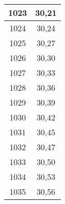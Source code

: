 \documentclass[10pt]{article}
\begin{document}
\begin{table}[!ht]
\begin{tabular}{|c|c|}
    1023 & 30,21 \\ \hline
    1024 & 30,24 \\ \hline
    1025 & 30,27 \\ \hline
    1026 & 30,30 \\ \hline
    1027 & 30,33 \\ \hline
    1028 & 30,36 \\ \hline
    1029 & 30,39 \\ \hline
    1030 & 30,42 \\ \hline
    1031 & 30,45 \\ \hline
    1032 & 30,47 \\ \hline
    1033 & 30,50 \\ \hline
    1034 & 30,53 \\ \hline
    1035 & 30,56 \\ \hline
  \end{tabular}
\end{table}

\newpage
\end{document}
